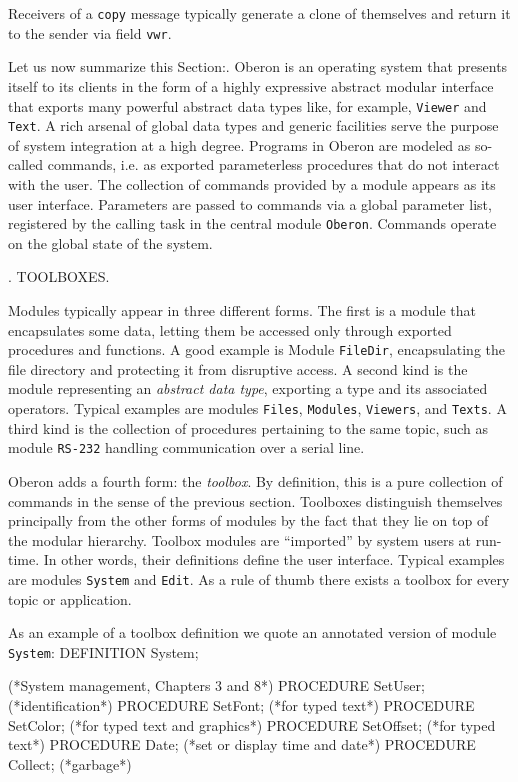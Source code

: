 \noindent Receivers of a {\tt copy\/} message typically generate a clone of
themselves and return it to the sender via field {\tt vwr\/}.

Let us now summarize this Section:. Oberon is an operating system that
presents itself to its clients in the form of a highly expressive
abstract modular interface that exports many powerful abstract data
types like, for example, {\tt Viewer\/} and {\tt Text\/}. A rich arsenal of global
data types and generic facilities serve the purpose of system
integration at a high degree. Programs in Oberon are modeled as
so-called commands, i.e. as exported parameterless procedures that do
not interact with the user. The collection of commands provided by a
module appears as its user interface. Parameters are passed to
commands via a global parameter list, registered by the calling task
in the central module {\tt Oberon\/}. Commands operate on the global state of
the system.

. TOOLBOXES.

Modules typically appear in three different forms. The first is a
module that encapsulates some data, letting them be accessed only
through exported procedures and functions. A good example is Module
{\tt FileDir\/}, encapsulating the file directory and protecting it from
disruptive access. A second kind is the module representing an
{\it abstract data type\/}, exporting a type and its associated
operators. Typical examples are modules {\tt Files\/}, {\tt Modules\/}, {\tt Viewers\/}, and
{\tt Texts\/}. A third kind is the collection of procedures pertaining to the
same topic, such as module {\tt RS-232\/} handling communication over a serial
line.

Oberon adds a fourth form: the {\it toolbox\/}. By definition, this is a pure
collection of commands in the sense of the previous section. Toolboxes
distinguish themselves principally from the other forms of modules by
the fact that they lie on top of the modular hierarchy. Toolbox
modules are ``imported'' by system users at run-time. In other words,
their definitions define the user interface. Typical examples are
modules {\tt System\/} and {\tt Edit\/}. As a rule of thumb there exists a toolbox for
every topic or application.

As an example of a toolbox definition we quote an annotated version of
module {\tt System\/}:
\begintt
DEFINITION System;

(*System management, Chapters 3 and 8*)
  PROCEDURE SetUser; (*identification*)
  PROCEDURE SetFont; (*for typed text*)
  PROCEDURE SetColor; (*for typed text and graphics*)
  PROCEDURE SetOffset; (*for typed text*)
  PROCEDURE Date; (*set or display time and date*)
  PROCEDURE Collect; (*garbage*)
  
